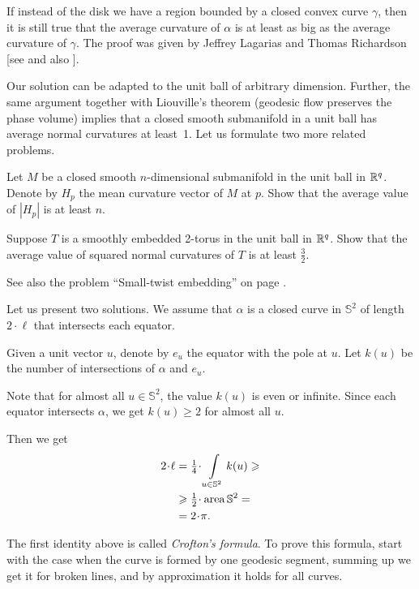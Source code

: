 If instead of the disk we have a region bounded by a closed convex curve $\gamma$, 
then it is still true that the average curvature of $\alpha$ is at least as big as the average curvature of $\gamma$. 
The proof was given by Jeffrey Lagarias
and Thomas Richardson [see  and also ].

Our solution can be adapted to the unit ball of arbitrary dimension.
Further, the same argument together with Liouville's theorem (geodesic flow preserves the phase volume) implies that a closed smooth submanifold in a unit ball has average normal curvatures at least~1.
Let us formulate two more related problems.

\begin{pr}
Let $M$ be a closed smooth $n$-dimensional submanifold in the unit ball in $\mathbb{R}^q$.
Denote by $H_p$ the mean curvature vector of $M$ at $p$.
Show that the average value of $|H_p|$ is at least $n$.
\end{pr}

\begin{pr}
Suppose $T$ is a smoothly embedded 2-torus in the unit ball in $\mathbb{R}^q$.
Show that the average value of squared normal curvatures of $T$ is at least $\tfrac32$.
\end{pr}

See also the problem ``Small-twist embedding'' on page \pageref{Small-twist}.

Let us present two solutions.
We assume that $\alpha$ is a closed curve in $\mathbb{S}^2$ of length $2\cdot\ell$ that intersects each equator.

Given a unit vector $u$, denote by $e_u$ the equator with the pole at $u$.
Let $k(u)$ be the number of intersections
of $\alpha$ and $e_u$.

Note that for almost all $u\in \mathbb{S}^2$, the value $k(u)$ is even or infinite.
Since each equator intersects $\alpha$, we get $k(u)\ge 2$ for almost all $u$.

Then we get
\begin{align*}
2\cdot\ell&=\tfrac14\cdot\int\limits_{u\in \mathbb{S}^2}k(u)\ge 
\\
&\ge\tfrac12\cdot\area\mathbb{S}^2=
\\
&=2\cdot\pi.
\end{align*}

The first identity above is called \emph{Crofton's formula}.
To prove this formula, start with the case when the curve is formed by one geodesic segment, summing up we get it for broken lines, and by approximation it holds for all curves.
\qeds

